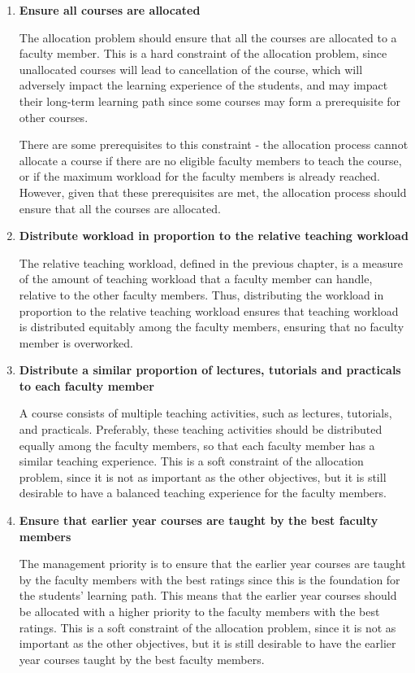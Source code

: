 \begin{enumerate}
  \item \textbf{Ensure all courses are allocated}

        The allocation problem should ensure that all the courses are allocated to a faculty member. This is a hard constraint of the allocation problem, since unallocated courses will lead to cancellation of the course, which will adversely impact the learning experience of the students, and may impact their long-term learning path since some courses may form a prerequisite for other courses.

        There are some prerequisites to this constraint - the allocation process cannot allocate a course if there are no eligible faculty members to teach the course, or if the maximum workload for the faculty members is already reached. However, given that these prerequisites are met, the allocation process should ensure that all the courses are allocated.

  \item \textbf{Distribute workload in proportion to the relative teaching workload}

        The relative teaching workload, defined in the previous chapter, is a measure of the amount of teaching workload that a faculty member can handle, relative to the other faculty members. Thus, distributing the workload in proportion to the relative teaching workload ensures that teaching workload is distributed equitably among the faculty members, ensuring that no faculty member is overworked.

  \item \textbf{Distribute a similar proportion of lectures, tutorials and practicals to each faculty member}

        A course consists of multiple teaching activities, such as lectures, tutorials, and practicals. Preferably, these teaching activities should be distributed equally among the faculty members, so that each faculty member has a similar teaching experience. This is a soft constraint of the allocation problem, since it is not as important as the other objectives, but it is still desirable to have a balanced teaching experience for the faculty members.

  \item \textbf{Ensure that earlier year courses are taught by the best faculty members}

        The management priority is to ensure that the earlier year courses are taught by the faculty members with the best ratings since this is the foundation for the students' learning path. This means that the earlier year courses should be allocated with a higher priority to the faculty members with the best ratings. This is a soft constraint of the allocation problem, since it is not as important as the other objectives, but it is still desirable to have the earlier year courses taught by the best faculty members.


\end{enumerate}
